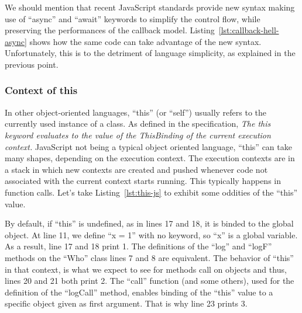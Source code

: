 

We should mention that recent JavaScript standards provide new syntax
making use of ``async'' and ``await'' keywords to simplify
the control flow, while preserving the performances of
the callback model.
Listing~\ref{lst:callback-hell-async} shows how the same code can take advantage of the new syntax.
Unfortunately, this is to the detriment of language simplicity,
as explained in the previous point.



\subsubsection{Context of this}%
\label{ssub:context_of_this}

In other object-oriented languages,
``this'' (or ``self'') usually refers to the currently used instance of a class.
As defined in the specification,
\textit{The this keyword evaluates to the value of the ThisBinding of the current execution context.} 
JavaScript not being a typical object oriented language,
``this'' can take many shapes, depending on the execution context.
The execution contexts are in a stack in which new contexts are created and pushed
whenever code not associated with the current context starts running.
This typically happens in function calls.
Let's take Listing~\ref{lst:this-js} to exhibit some oddities of the ``this'' value.


By default, if ``this'' is undefined, as in lines 17 and 18,
it is binded to the global object.
At line 11, we define ``x = 1'' with no keyword,
so ``x'' is a global variable.
As a result, line 17 and 18 print 1.
The definitions of the ``log'' and ``logF'' methods on the ``Who'' class
lines 7 and 8 are equivalent. The behavior of ``this'' in that context,
is what we expect to see for methods call on objects and thus,
lines 20 and 21 both print 2.
The ``call'' function (and some others), used for the definition of the ``logCall'' method,
enables binding of the ``this'' value to a specific object given as first argument.
That is why line 23 prints 3.

